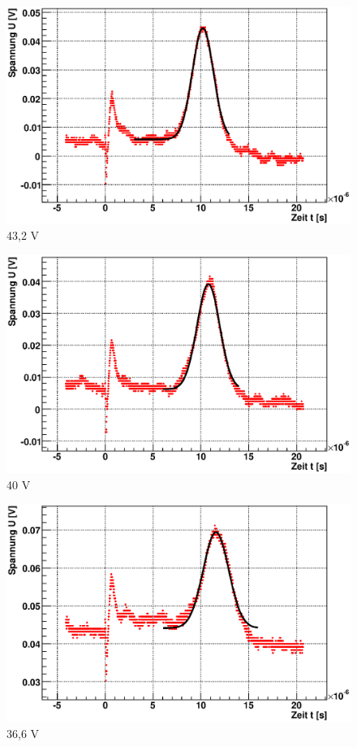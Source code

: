 \documentclass[12pt]{article}
\begin{document}
\begin{figure}[H]  
\begin{minipage}{0.33\linewidth}
\centering
\includegraphics[width=0.9\linewidth]{pictures/varVolt/03.eps}
\small{43,2 V}
\end{minipage}
\begin{minipage}{0.33\linewidth}
\centering
\includegraphics[width=0.9\linewidth]{pictures/varVolt/04.eps}
\small{40 V}
\end{minipage}
\begin{minipage}{0.33\linewidth}
\centering 
\includegraphics[width=0.9\linewidth]{pictures/varVolt/05.eps}
\small{36,6 V}
\end{minipage}
\end{figure}
\end{document}
